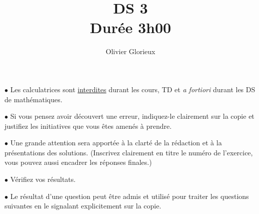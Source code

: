 \documentclass[a4paper, 11pt,reqno]{article}
\author{Olivier Glorieux}
\begin{document}
\title{DS 3\\
\Large{Durée 3h00}
}

\vspace{1cm}
\begin{center}

\begin{description}
\item$\bullet$ Les calculatrices sont \underline{interdites} durant les cours, TD et \emph{a fortiori} durant les DS de mathématiques. \\

\item $\bullet $ Si vous pensez avoir découvert une erreur, indiquez-le clairement sur la copie et justifiez les initiatives que vous êtes amenés à prendre. \\

\item $\bullet$ Une grande attention sera apportée à la clarté de la rédaction et à la présentations des solutions. (Inscrivez clairement en titre le numéro de l'exercice, vous pouvez aussi encadrer les réponses finales.)  \\

\item $\bullet$ Vérifiez vos résultats. \\

\item $\bullet$ Le résultat d'une question peut être admis et utilisé pour traiter les questions suivantes en le signalant explicitement sur la copie. 
\end{description}

\end{center} 
\vspace{1cm}


%


\newpage
\end{document}
